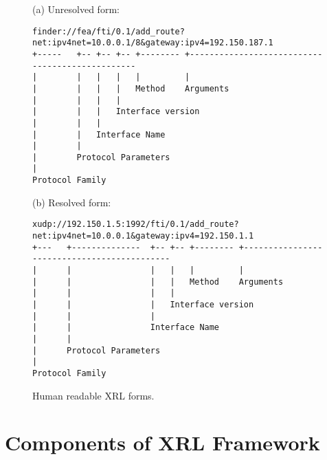 \documentclass[11pt]{article}
\begin{document}
\clearpage
\begin{sidewaysfigure}
(a) Unresolved form:

\begin{centering}
\small\begin{verbatim}
finder://fea/fti/0.1/add_route?net:ipv4net=10.0.0.1/8&gateway:ipv4=192.150.187.1
+-----   +-- +-- +-- +-------- +------------------------------------------------
|        |   |   |   |         |
|        |   |   |   Method    Arguments
|        |   |   |
|        |   |   Interface version 
|        |   |
|        |   Interface Name  
|        | 
|        Protocol Parameters
|
Protocol Family
\end{verbatim}
\end{centering}
\normalsize

(b) Resolved form:

\small
\begin{verbatim}
xudp://192.150.1.5:1992/fti/0.1/add_route?net:ipv4net=10.0.0.1&gateway:ipv4=192.150.1.1
+---   +--------------  +-- +-- +-------- +--------------------------------------------
|      |                |   |   |         |
|      |                |   |   Method    Arguments
|      |                |   |
|      |                |   Interface version 
|      |                |
|      |                Interface Name  
|      | 
|      Protocol Parameters
|
Protocol Family
\end{verbatim}
\normalsize
\caption{\label{fig:human-readable}Human readable XRL forms.}
\end{sidewaysfigure}
\clearpage

\section{Components of XRL Framework}
\end{document}
